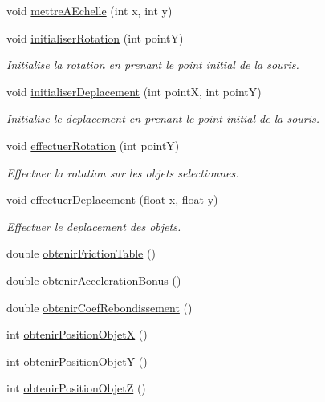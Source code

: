 \begin{DoxyCompactItemize}
\item 
void \hyperlink{group__inf2990_gaffcf7c590a0ae08d5b018d646b6e6b9d}{mettre\+A\+Echelle} (int x, int y)
\item 
void \hyperlink{group__inf2990_gae4dafde19e9c66c81a2937af9884a987}{initialiser\+Rotation} (int pointY)
\begin{DoxyCompactList}\small\item\em Initialise la rotation en prenant le point initial de la souris. \end{DoxyCompactList}\item 
void \hyperlink{group__inf2990_gaa11820c8cd950a8aa4bab5c8a5cffae2}{initialiser\+Deplacement} (int pointX, int pointY)
\begin{DoxyCompactList}\small\item\em Initialise le deplacement en prenant le point initial de la souris. \end{DoxyCompactList}\item 
void \hyperlink{group__inf2990_ga3df43140795a4426e4408e968a21f22f}{effectuer\+Rotation} (int pointY)
\begin{DoxyCompactList}\small\item\em Effectuer la rotation sur les objets selectionnes. \end{DoxyCompactList}\item 
void \hyperlink{group__inf2990_ga3674bdc526c4046c7a53393fa0183d1c}{effectuer\+Deplacement} (float x, float y)
\begin{DoxyCompactList}\small\item\em Effectuer le deplacement des objets. \end{DoxyCompactList}\item 
double \hyperlink{group__inf2990_gad132f27b4e86f25aef4d8b9ad93fe210}{obtenir\+Friction\+Table} ()
\item 
double \hyperlink{group__inf2990_ga2f768cce7db86eba06e1e448a4efa2f2}{obtenir\+Acceleration\+Bonus} ()
\item 
double \hyperlink{group__inf2990_ga1376bb78e311e9c724cd87d454a385b6}{obtenir\+Coef\+Rebondissement} ()
\item 
int \hyperlink{group__inf2990_gae6d3005130428ead82d1dfbcab7332ca}{obtenir\+Position\+ObjetX} ()
\item 
int \hyperlink{group__inf2990_ga9cebbfb71c3263597c8f0ddfb0bf78bd}{obtenir\+Position\+ObjetY} ()
\item 
int \hyperlink{group__inf2990_gadbef9c5a1e0a2c76a0de1186763b4801}{obtenir\+Position\+ObjetZ} ()
\item 

\end{DoxyCompactItemize}
